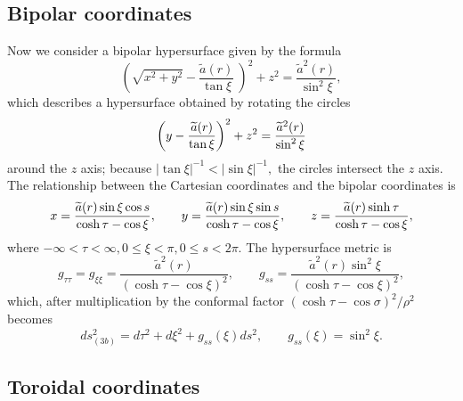 \documentclass[a4paper,preprint,prabib,aps]{revtex4}
\begin{document}
\subsection{ Bipolar coordinates}

Now we consider a bipolar hypersurface given by the formula
\begin{equation}
\left( \sqrt{x^{2}+y^{2}}-\frac{\widetilde{a}(r)}{\tan \xi }\ \right)
^{2}+z^{2}=\frac{\widetilde{a}^{2}(r)}{\sin ^{2}\xi },  \label{bip}
\end{equation}
which describes a hypersurface obtained by rotating the circles
\[
\left( y-\frac{\widetilde{a}(r)}{\tan \xi }\right) ^{2}+z^{2}=\frac{%
\widetilde{a}^{2}(r)}{\sin ^{2}\xi }
\]
around the $z$ axis; because $|\tan \xi |^{-1}<|\sin \xi |^{-1},$ the
circles intersect the $z$ axis. The relationship between the Cartesian
coordinates and the bipolar coordinates is
\[
x=\frac{\widetilde{a}(r)\sin \xi \cos s}{\cosh \tau -\cos \xi },\qquad y=%
\frac{\widetilde{a}(r)\sin \xi \sin s}{\cosh \tau -\cos \xi },\qquad z=\frac{%
\widetilde{a}(r)\sinh \tau }{\cosh \tau -\cos \xi },
\]
where $-\infty <\tau <\infty ,0\leq \xi <\pi ,0\leq s<2\pi $. The
hypersurface metric is
\[
g_{\tau \tau }=g_{\xi \xi }=\frac{\widetilde{a}^{2}(r)}{\left( \cosh \tau
-\cos \xi \right) ^{2}},\qquad g_{ss}=\frac{\widetilde{a}^{2}(r)\sin ^{2}\xi
}{\left( \cosh \tau -\cos \xi \right) ^{2}},
\]
which, after multiplication by the conformal factor $\left( \cosh \tau -\cos
\sigma \right) ^{2}/\rho ^{2}$ becomes
\begin{equation}
ds_{(3b)}^{2}=d\tau ^{2}+d\xi ^{2}+g_{ss}(\xi )ds^{2},\qquad g_{ss}(\xi
)=\sin ^{2}\xi .  \label{mbipcy}
\end{equation}

\subsection{Toroidal coordinates}
\end{document}
